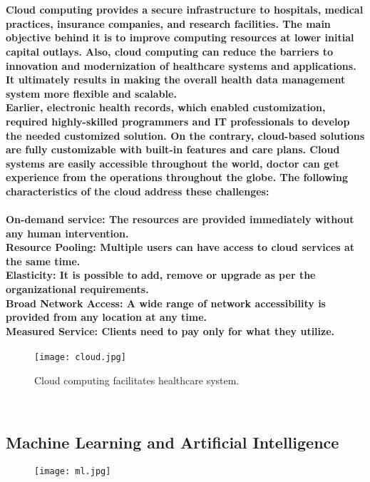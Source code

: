 \documentclass[12pt]{article}
\begin{document}
    \\\paragraph{Cloud computing provides a secure infrastructure to hospitals, medical practices, insurance companies, and research facilities. The main objective behind it is to improve computing resources at lower initial capital outlays. Also, cloud computing can reduce the barriers to innovation and modernization of healthcare systems and applications. It ultimately results in making the overall health data management system more flexible and scalable.\\
    Earlier, electronic health records, which enabled customization, required highly-skilled programmers and IT professionals to develop the needed customized solution. On the contrary, cloud-based solutions are fully customizable with built-in features and care plans. Cloud systems are easily accessible throughout the world, doctor can get experience from the operations throughout the globe. The following characteristics of the cloud address these challenges:
    \\\\\textbf{On-demand service:} The resources are provided immediately without any human intervention.
    \\\textbf{Resource Pooling:} Multiple users can have access to cloud services at the same time.
    \\\textbf{Elasticity:} It is possible to add, remove or upgrade as per the organizational requirements.
    \\\textbf{Broad Network Access:} A wide range of network accessibility is provided from any location at any time.
    \\\textbf{Measured Service:} Clients need to pay only for what they utilize.}
          \begin{figure}[h]
          	\texttt{[image: cloud.jpg]}
          	\caption{Cloud computing facilitates healthcare system.}
          \end{figure}
    \\\subsection{Machine Learning and Artificial Intelligence}
          \begin{figure}[h]
          	\texttt{[image: ml.jpg]}
          	\caption{}
          \end{figure}
\end{document}
